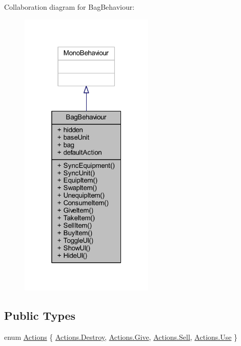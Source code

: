 Collaboration diagram for Bag\+Behaviour\+:
\nopagebreak
\begin{figure}[H]
\begin{center}
\leavevmode
\includegraphics[width=181pt]{class_bag_behaviour__coll__graph}
\end{center}
\end{figure}
\subsection*{Public Types}
\begin{DoxyCompactItemize}
\item 
enum \mbox{\hyperlink{class_bag_behaviour_aeafbbbda3c9a34d1a73647a8b274788c}{Actions}} \{ \mbox{\hyperlink{class_bag_behaviour_aeafbbbda3c9a34d1a73647a8b274788ca0e181f89f47654b86f3beb42f5cc08b8}{Actions.\+Destroy}}, 
\mbox{\hyperlink{class_bag_behaviour_aeafbbbda3c9a34d1a73647a8b274788ca2f355d9fa7accc561d3edc335de2fbcf}{Actions.\+Give}}, 
\mbox{\hyperlink{class_bag_behaviour_aeafbbbda3c9a34d1a73647a8b274788ca3068c5a98c003498f1fec0c489212e8b}{Actions.\+Sell}}, 
\mbox{\hyperlink{class_bag_behaviour_aeafbbbda3c9a34d1a73647a8b274788caad8783089f828b927473fb61d51940ec}{Actions.\+Use}}
 \}
\end{DoxyCompactItemize}
